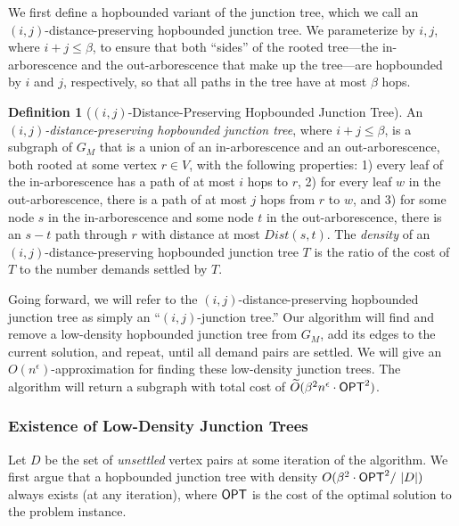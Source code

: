\documentclass{article}
\theoremstyle{definition}
\newtheorem{definition}{Definition}
\theoremstyle{remark}
\def\opt {{\sf OPT}}
\begin{document}
We first define a hopbounded variant of the junction tree, which we call an $(i,j)$-distance-preserving hopbounded junction tree. We parameterize by $i,j$, where $i+j \leq \beta$, to ensure that both ``sides'' of the rooted tree---the in-arborescence and the out-arborescence that make up the tree---are hopbounded by $i$ and $j$, respectively, so that all paths in the tree have at most $\beta$ hops. 

\begin{definition}[$(i,j)$-Distance-Preserving Hopbounded Junction Tree] 
     An \textit{$(i,j)$-distance-preserving hopbounded junction tree}, where $i + j \leq \beta$, is a subgraph of $G_M$ that is a union of an in-arborescence and an out-arborescence, both rooted at some vertex $r \in V$, with the following properties: 1) every leaf of the in-arborescence has a path of at most $i$ hops to $r$, 2) for every leaf $w$ in the out-arborescence, there is a path of at most $j$ hops from $r$ to $w$, and 3) for some node $s$ in the in-arborescence and some node $t$ in the out-arborescence, there is an  $s-t$ path through $r$ with distance at most $Dist(s,t)$. The \textit{density} of an $(i,j)$-distance-preserving hopbounded junction tree $T$ is the ratio of the cost of $T$ to the number demands settled by $T$. 
\end{definition}

Going forward, we will refer to the $(i,j)$-distance-preserving hopbounded junction tree as simply an ``$(i,j)$-junction tree.'' Our algorithm will find and remove a low-density hopbounded junction tree from $G_M$, add its edges to the current solution, and repeat, until all demand pairs are settled. 
We will give an $O(n^\epsilon)$-approximation for finding these low-density junction trees. The algorithm will return a subgraph with total cost of $\widetilde{O} (\beta^2 n^\epsilon \cdot {{\opt}}^2 )$.

\subsubsection{Existence of Low-Density Junction Trees}
Let $D$ be the set of \textit{unsettled} vertex pairs at some iteration of the algorithm.
We first argue that a hopbounded junction tree with density $O (\beta^2 \cdot {\opt}^2 / \mbox{ } |D| )$ always exists (at any iteration), where ${\opt}$ is the cost of the optimal solution to the problem instance. 
\end{document}
